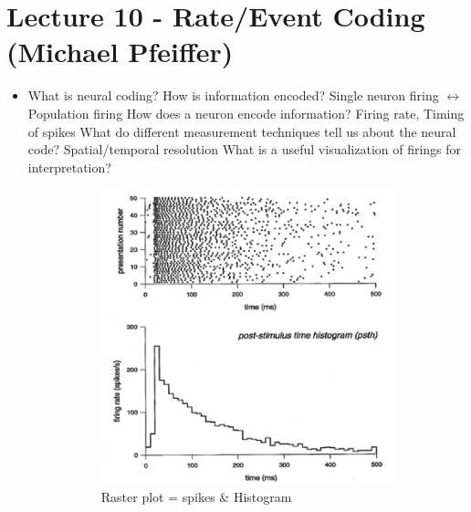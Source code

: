 \documentclass[english,11pt]{article}
\begin{document}
\section{Lecture 10 - Rate/Event Coding (Michael Pfeiffer)}
\begin{itemize}
\item What is neural coding?
\subitem How is information encoded?
\subitem Single neuron firing $\leftrightarrow$  Population firing
\subitem How does a neuron encode information?
\subitem Firing rate, Timing of spikes
\subitem What do different measurement techniques tell us about the neural code?
\subitem Spatial/temporal resolution
\subitem What is a useful visualization of firings for interpretation?
\begin{figure}[H]
        \centering
        \begin{subfigure}[b]{0.5\textwidth}
                \centering
				\includegraphics[width=\textwidth]{neural-coding-problem.png}
				\caption{Raster plot = spikes \& Histogram}
        \end{subfigure}%
        ~
        \begin{subfigure}[b]{0.5\textwidth}
                \centering

\end{subfigure}
\end{figure}
\end{itemize}
\end{document}

